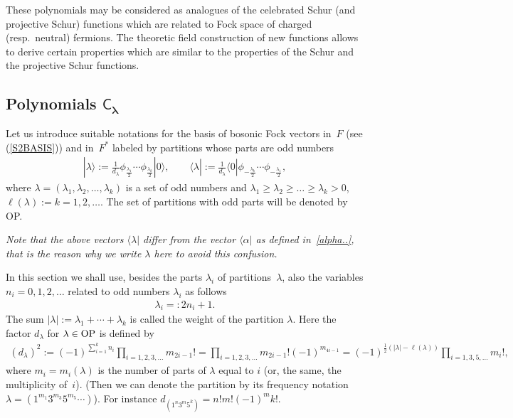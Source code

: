 \documentclass[pdftex]{sigma}
\numberwithin{equation}{section}
\newcommand{\C}{\textsf{C}_}
\renewcommand{\l}{\langle}
\renewcommand{\r}{\rangle}
\begin{document}
These polynomials may be considered as analogues of the celebrated Schur (and projective Schur) functions which are related to
Fock space of charged (resp.\ neutral) fermions. The theoretic f\/ield construction of new functions allows to derive certain
properties which are similar to the properties of the Schur and the projective Schur functions.


\subsection[Polynomials $\C\lambda$]{Polynomials $\boldsymbol{\C\lambda}$}


Let us introduce  suitable notations for the basis of bosonic Fock
vectors in~$F$ (see (\ref{S2BASIS})) and in~$F^*$ labeled by
partitions whose parts are odd numbers
 \begin{gather} \label{basis-vectors} |\lambda\r
:=\frac{1}{{d_\lambda}}\phi_{\frac{\lambda_1}2}\cdots
\phi_{\frac{\lambda_k}2} |0\r ,\qquad \l \lambda | :=\frac{
1}{d_\lambda}\l 0|\phi_{-\frac{\lambda_k}2} \cdots
\phi_{-\frac{\lambda_1}2} ,
 \end{gather}
  where $\lambda=(\lambda_1,\lambda_2,\dots,\lambda_k)$ is a set
  of odd numbers and
   $\lambda_1 \ge\lambda_2\ge\dots\ge\lambda_k>0$, $
   \ell(\lambda):=
k=1,2,\dots  $. The set of partitions with odd parts will be
denoted by OP.

{\it Note that the above vectors     $\l \lambda |$ differ from the  vector $\l \alpha |$ as defined in~\eqref{alpha..},
that is the reason why we write $\lambda$ here to avoid this confusion.}

 In this section we shall use, besides the parts $\lambda_i$ of partitions~$\lambda$, also
the variables $n_i=0,1,2,\dots$ related to odd numbers $\lambda_i$
as follows
 \begin{gather}\label{n-lambda}
\lambda_i =:   2n_i+1 .
 \end{gather}
The sum $|\lambda|:=\lambda_1+\cdots + \lambda_k$ is called the
weight of the partition $\lambda$.  Here the factor $d_\lambda$
for $\lambda\in \rm OP$ is def\/ined by
\begin{gather*}
(d_\lambda)^2:= (-1)^{\sum\limits_{i=1}^k n_i} \!\prod_{i= 1,2,3,\dots}\!
m_{2i-1}!= \prod_{i= 1,2,3,\dots}\! m_{2i-1}!{(-1)^{
m_{4i-1}}} = (-1)^{\frac 12(|\lambda|-\ell(\lambda))} \!\prod_{i=
1,3,5,\dots}\! m_i!,
\end{gather*}
 where $m_i=m_i(\lambda)$ is the number of parts
of $\lambda$ equal to $i$ (or, the same, the multiplicity of~$i$).
(Then we can denote the partition by its frequency notation
$\lambda=(1^{m_1}3^{m_3}5^{m_5}\cdots)$). For instance $
d_{(1^n3^m5^k)}=n!m!(-1)^{m}k! $.
\end{document}
